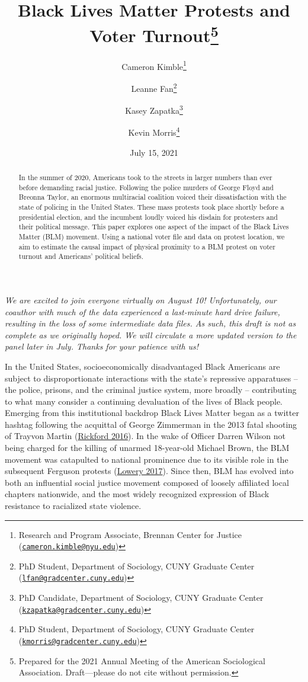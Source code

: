\documentclass[
  12pt,
]{article}
\title{Black Lives Matter Protests and Voter Turnout\thanks{Prepared for the 2021 Annual Meeting of the American Sociological Association. Draft---please do not cite without permission.}}
\author{Cameron Kimble\footnote{Research and Program Associate, Brennan Center for Justice (\href{mailto:cameron.kimble@nyu.edu}{\nolinkurl{cameron.kimble@nyu.edu}})} \and Leanne Fan\footnote{PhD Student, Department of Sociology, CUNY Graduate Center (\href{mailto:lfan@gradcenter.cuny.edu}{\nolinkurl{lfan@gradcenter.cuny.edu}})} \and Kasey Zapatka\footnote{PhD Candidate, Department of Sociology, CUNY Graduate Center (\href{mailto:kzapatka@gradcenter.cuny.edu}{\nolinkurl{kzapatka@gradcenter.cuny.edu}})} \and Kevin Morris\footnote{PhD Student, Department of Sociology, CUNY Graduate Center (\href{mailto:kmorris@gradcenter.cuny.edu}{\nolinkurl{kmorris@gradcenter.cuny.edu}})}}
\date{July 15, 2021}
\begin{document}
\maketitle
\begin{abstract}
In the summer of 2020, Americans took to the streets in larger numbers than ever before demanding racial justice. Following the police murders of George Floyd and Breonna Taylor, an enormous multiracial coalition voiced their dissatisfaction with the state of policing in the United States. These mass protests took place shortly before a presidential election, and the incumbent loudly voiced his disdain for protesters and their political message. This paper explores one aspect of the impact of the Black Lives Matter (BLM) movement. Using a national voter file and data on protest location, we aim to estimate the causal impact of physical proximity to a BLM protest on voter turnout and Americans' political beliefs.
\end{abstract}

\pagebreak
\doublespacing


\emph{We are excited to join everyone virtually on August 10! Unfortunately, our coauthor with much of the data experienced a last-minute hard drive failure, resulting in the loss of some intermediate data files. As such, this draft is not as complete as we originally hoped. We will circulate a more updated version to the panel later in July. Thanks for your patience with us!}

In the United States, socioeconomically disadvantaged Black Americans are subject to disproportionate interactions with the state's repressive apparatuses -- the police, prisons, and the criminal justice system, more broadly -- contributing to what many consider a continuing devaluation of the lives of Black people. Emerging from this institutional backdrop Black Lives Matter began as a twitter hashtag following the acquittal of George Zimmerman in the 2013 fatal shooting of Trayvon Martin (\protect\hyperlink{ref-Rickford2016}{Rickford 2016}). In the wake of Officer Darren Wilson not being charged for the killing of unarmed 18-year-old Michael Brown, the BLM movement was catapulted to national prominence due to its visible role in the subsequent Ferguson protests (\protect\hyperlink{ref-Lowery2017}{Lowery 2017}). Since then, BLM has evolved into both an influential social justice movement composed of loosely affiliated local chapters nationwide, and the most widely recognized expression of Black resistance to racialized state violence.
\end{document}
